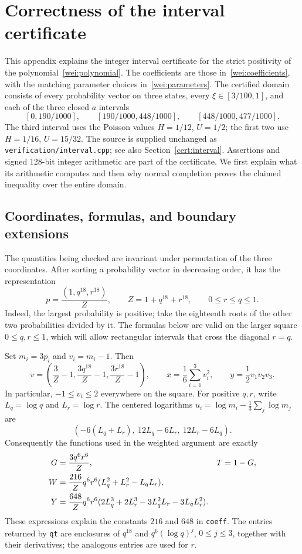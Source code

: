 \section{Correctness of the interval certificate}
\label{int:certificate}
\label{int:appendix}

This appendix explains the integer interval certificate for the strict
positivity of the polynomial~\eqref{wei:polynomial}.  The coefficients are
those in~\eqref{wei:coefficients}, with the matching parameter choices
in~\eqref{wei:parameters}.  The certified domain consists of every probability
vector on three states, every $\xi\in[3/100,1]$, and each of the three closed
$a$ intervals
\[
 [0,190/1000],\qquad [190/1000,448/1000],\qquad
 [448/1000,477/1000].
\]
The third interval uses the Poisson values $H=1/12$, $U=1/2$; the first
two use $H=1/16$, $U=15/32$.  The source is supplied unchanged as
\texttt{verification/interval.cpp}; see also
Section~\ref{cert:interval}.  Assertions and signed 128-bit integer
arithmetic are part of the certificate.  We first explain what its
arithmetic computes and then why normal completion proves the claimed
inequality over the entire domain.

\subsection{Coordinates, formulas, and boundary extensions}
\label{int:parametrization}

The quantities being checked are invariant under permutation of the
three coordinates.  After sorting a probability vector in decreasing
order, it has the representation
\begin{equation}
 p=\frac{(1,q^{18},r^{18})}{Z},\qquad
 Z=1+q^{18}+r^{18},\qquad 0\le r\le q\le1.
 \label{int:coordinates}
\end{equation}
Indeed, the largest probability is positive; take the eighteenth roots
of the other two probabilities divided by it.  The formulas below are
valid on the larger square $0\le q,r\le1$, which will allow rectangular
intervals that cross the diagonal $r=q$.

Set $m_i=3p_i$ and $v_i=m_i-1$.  Then
\[
 v=\left(\frac3Z-1,\frac{3q^{18}}Z-1,
                  \frac{3r^{18}}Z-1\right),\qquad
 x=\frac16\sum_{i=1}^3v_i^2,\qquad y=\frac12v_1v_2v_3.
\]
In particular, $-1\le v_i\le2$ everywhere on the square.  For positive
$q,r$, write $L_q=\log q$ and $L_r=\log r$.  The centered logarithms
$u_i=\log m_i-\frac13\sum_j\log m_j$ are
\[
 (-6(L_q+L_r),\ 12L_q-6L_r,\ 12L_r-6L_q).
\]
Consequently the functions used in the weighted argument are exactly
\begin{align}
 G&=\frac{3q^6r^6}{Z},& T&=1-G,\notag\\
 W&=\frac{216}{Z}q^6r^6(L_q^2+L_r^2-L_qL_r),\notag\\
 Y&=\frac{648}{Z}q^6r^6
    (2L_q^3+2L_r^3-3L_q^2L_r-3L_qL_r^2).
 \label{int:weighted-functions}
\end{align}
These expressions explain the constants $216$ and $648$ in
\texttt{coeff}.  The entries returned by \texttt{qt} are enclosures of
$q^{18}$ and $q^6(\log q)^j$, $0\le j\le3$, together with their
derivatives; the analogous entries are used for $r$.

